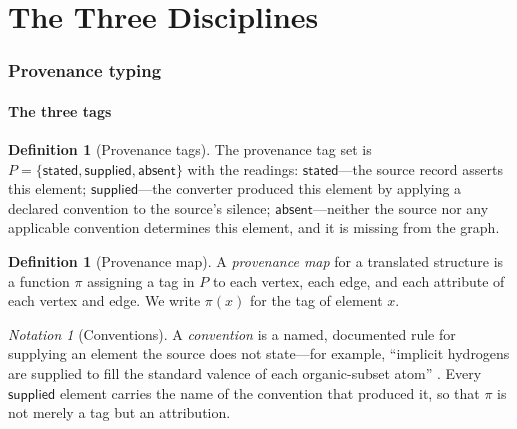 \documentclass[11pt,twocolumn,a4paper]{article}
\theoremstyle{msthm}
\theoremstyle{definition}
\newtheorem{definition}[theorem]{Definition}
\theoremstyle{remark}
\newtheorem{notation}[theorem]{Notation}
\newcommand{\Prov}{\pi}
\newcommand{\stated}{\textsf{stated}}
\newcommand{\supplied}{\textsf{supplied}}
\newcommand{\absent}{\textsf{absent}}
\begin{document}
\part{The Three Disciplines}

\section{Provenance typing}
\label{sec:provenance}

\subsection{The three tags}

\begin{definition}[Provenance tags]
\label{def:tags}
The provenance tag set is $P=\{\stated,\supplied,\absent\}$ with the
readings: $\stated$---the source record asserts this element;
$\supplied$---the converter produced this element by applying a declared
convention to the source's silence; $\absent$---neither the source nor
any applicable convention determines this element, and it is missing
from the graph.
\end{definition}

\begin{definition}[Provenance map]
\label{def:prov}
A \emph{provenance map} for a translated structure is a function
$\Prov$ assigning a tag in $P$ to each vertex, each edge, and each
attribute of each vertex and edge. We write $\Prov(x)$ for the tag of
element $x$.
\end{definition}

\begin{notation}[Conventions]
\label{not:conventions}
A \emph{convention} is a named, documented rule for supplying an element
the source does not state---for example, ``implicit hydrogens are
supplied to fill the standard valence of each organic-subset atom''
\citep{opensmiles}. Every $\supplied$ element carries the name of the
convention that produced it, so that $\Prov$ is not merely a tag but an
attribution.
\end{notation}
\end{document}
